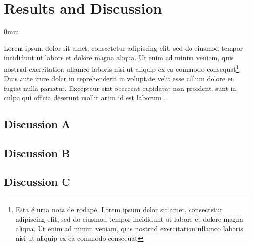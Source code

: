 \documentclass[./main.tex]{subfiles}
\begin{document}
\section{Results and Discussion} \label{discussion}

\begin{adjustwidth}{\bodytab}{0mm}

\par Lorem ipsum dolor sit amet, consectetur adipiscing elit, sed do eiusmod tempor incididunt ut labore et dolore magna aliqua. Ut enim ad minim veniam, quis nostrud exercitation ullamco laboris nisi ut aliquip ex ea commodo consequat\footnote{Esta é uma nota de rodapé. Lorem ipsum dolor sit amet, consectetur adipiscing elit, sed do eiusmod tempor incididunt ut labore et dolore magna aliqua. Ut enim ad minim veniam, quis nostrud exercitation ullamco laboris nisi ut aliquip ex ea commodo consequat}. Duis aute irure dolor in reprehenderit in voluptate velit esse cillum dolore eu fugiat nulla pariatur. Excepteur sint occaecat cupidatat non proident, sunt in culpa qui officia deserunt mollit anim id est laborum \cite{Pearce2002a}.

\subsection{Discussion A} \label{discussion:a}





\subsection{Discussion B} \label{discussion:b}





\subsection{Discussion C} \label{discussion:c}





\end{adjustwidth}
\end{document}
